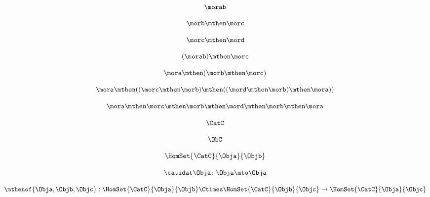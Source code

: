 \begin{forslides}
    \begin{equation}
        \label{eq:semicats-slides-08}
        \morab
    \end{equation}

    \begin{equation}
        \label{eq:semicats-slides-09}
        \morb \mthen \morc
    \end{equation}

    \begin{equation}
        \label{eq:10}
        \morc \mthen \mord
    \end{equation}

    \begin{equation}
        \label{eq:semicats-slides-11}
        (\morab) \mthen \morc
    \end{equation}

    \begin{equation}
        \label{eq:semicats-slides-12}
        \mora \mthen  (\morb \mthen \morc )
    \end{equation}

    \begin{equation}
        \label{eq:semicats-slides-13}
        \mora \mthen  ((\morc \mthen \morb ) \mthen (( \mord \mthen \morb ) \mthen \mora ))
    \end{equation}

    \begin{equation}
        \label{eq:semicats-slides-14}
        \mora \mthen  \morc \mthen \morb  \mthen \mord \mthen \morb  \mthen \mora
    \end{equation}

    \begin{equation}
        \label{eq:semicats-slides-15}
        \CatC
    \end{equation}

    \begin{equation}
        \label{eq:semicats-slides-16}
        \ObC
    \end{equation}

    \begin{equation}
        \label{eq:semicats-slides-17}
        \HomSet{\CatC}{\Obja}{\Objb}
    \end{equation}

    \begin{equation}
        \label{eq:semicats-slides-18}
        \catidat\Obja\colon \Obja \mto \Obja
    \end{equation}

    \begin{equation}
        \label{eq:semicats-slides-19}
        \mthenof{\Obja,\Objb,\Objc}: \HomSet{\CatC}{\Obja}{\Objb} \Ctimes \HomSet{\CatC}{\Objb}{\Objc}\to \HomSet{\CatC}{\Obja}{\Objc}
    \end{equation}


\end{forslides}
